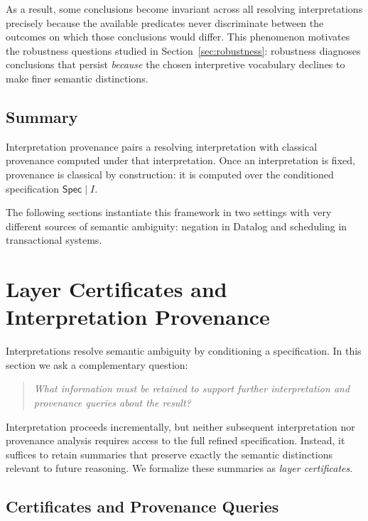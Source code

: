 \documentclass[acmsmall,nonacm]{acmart}
\theoremstyle{remark}
\numberwithin{definition}{section}
\numberwithin{theorem}{section}
\numberwithin{lemma}{section}
\numberwithin{corollary}{section}
\numberwithin{remark}{section}
\numberwithin{example}{section}
\numberwithin{observation}{section}
\numberwithin{assumption}{section}
\newcommand{\Spec}{\mathsf{Spec}}
\begin{document}
As a result, some conclusions become invariant across all resolving
interpretations precisely because the available predicates never discriminate
between the outcomes on which those conclusions would differ.
This phenomenon motivates the robustness questions studied in
Section~\ref{sec:robustness}: robustness diagnoses conclusions that persist
\emph{because} the chosen interpretive vocabulary declines to make finer semantic
distinctions.

\subsection{Summary}

Interpretation provenance pairs a resolving interpretation with classical
provenance computed under that interpretation.
Once an interpretation is fixed, provenance is classical by construction: it is
computed over the conditioned specification $\Spec \mid I$.

The following sections instantiate this framework in two settings with very
different sources of semantic ambiguity: negation in Datalog and scheduling in
transactional systems.


\section{Layer Certificates and Interpretation Provenance}
\label{sec:certificates}

Interpretations resolve semantic ambiguity by conditioning a specification.
In this section we ask a complementary question:

\begin{quote}
\emph{What information must be retained to support further interpretation
\emph{and} provenance queries about the result?}
\end{quote}

Interpretation proceeds incrementally, but neither subsequent interpretation nor
provenance analysis requires access to the full refined specification.
Instead, it suffices to retain summaries that preserve exactly the semantic
distinctions relevant to future reasoning.
We formalize these summaries as \emph{layer certificates}.

\subsection{Certificates and Provenance Queries}
\end{document}
